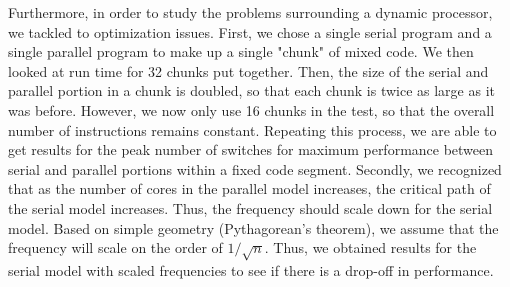 Furthermore, in order to study the problems surrounding a dynamic processor, we tackled to optimization issues. First, we chose a single serial program and a single parallel program to make up a single "chunk" of mixed code. We then looked at run time for 32 chunks put together. Then, the size of the serial and parallel portion in a chunk is doubled, so that each chunk is twice as large as it was before. However, we now only use 16 chunks in the test, so that the overall number of instructions remains constant. Repeating this process, we are able to get results for the peak number of switches for maximum performance between serial and parallel portions within a fixed code segment. Secondly, we recognized that as the number of cores in the parallel model increases, the critical path of the serial model increases. Thus, the frequency should scale down for the serial model. Based on simple geometry (Pythagorean's theorem), we assume that the frequency will scale on the order of $1 / \sqrt{n}$. Thus, we obtained results for the serial model with scaled frequencies to see if there is a drop-off in performance.